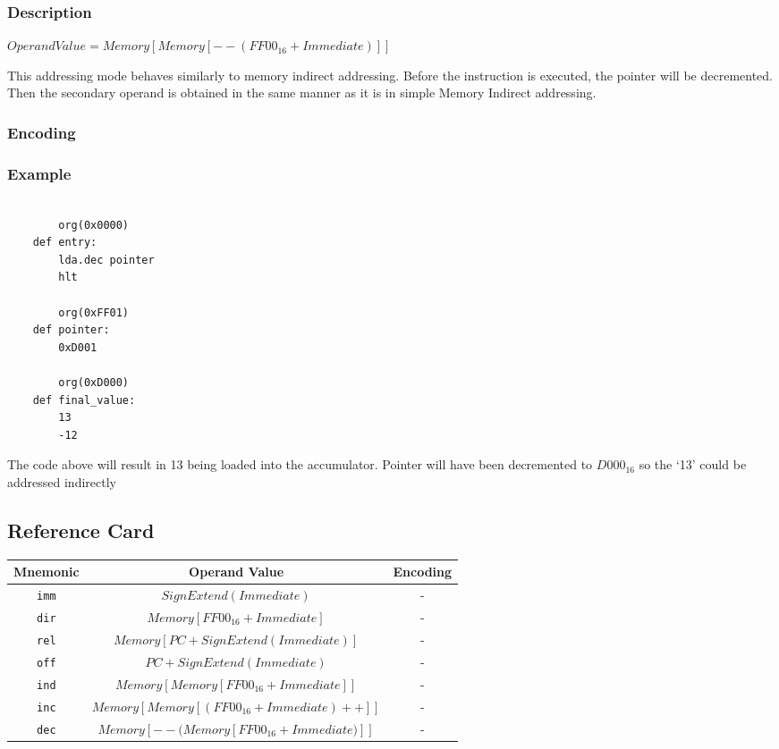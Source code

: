 \subsubsection{Description}
$OperandValue = Memory[Memory[--(FF00_{16} + Immediate)]]$
\par This addressing mode behaves similarly to memory indirect addressing.
Before the instruction is executed, the pointer will be decremented.
Then the secondary operand is obtained in the same manner as it is in simple Memory Indirect addressing.

\subsubsection{Encoding}

\subsubsection{Example}
\begin{verbatim}

        org(0x0000)
    def entry:
        lda.dec pointer
        hlt

        org(0xFF01)
    def pointer:
        0xD001

        org(0xD000)
    def final_value:
        13
        -12

\end{verbatim}
The code above will result in 13 being loaded into the accumulator.
Pointer will have been decremented to $D000_{16}$ so the `13' could be addressed indirectly
\pagebreak

\subsection{Reference Card}\label{subsec:reference-card}
\renewcommand{\arraystretch}{2.0}
\begin{center}
    \begin{adjustbox}{width=\textwidth}
        \begin{tabular}{ |c|c|c| }
            \hline
            Mnemonic & Operand Value & Encoding \\ \hline
            \texttt{imm} & $SignExtend(Immediate)$ & - \\ \hline
            \texttt{dir} & $Memory[FF00_{16} + Immediate]$ & -\\ \hline
            \texttt{rel} & $Memory[PC + SignExtend(Immediate)]$ & -\\ \hline
            \texttt{off} & $PC + SignExtend(Immediate)$ & -\\ \hline
            \texttt{ind} & $Memory[Memory[FF00_{16} + Immediate]]$ & -\\ \hline
            \texttt{inc} & $Memory[Memory[(FF00_{16} + Immediate)++]]$ & -\\ \hline
            \texttt{dec} & $Memory[--(Memory[FF00_{16} + Immediate)]]$ & -\\ \hline
        \end{tabular}
    \end{adjustbox}
\end{center}

